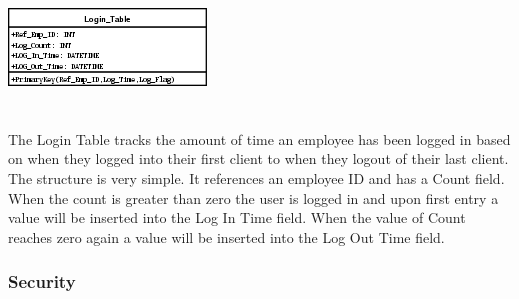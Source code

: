 \documentclass{report}
\begin{document}
	\includegraphics{Tables/LoginTable.png}\\
	\\
	\\
	The Login Table tracks the amount of time an employee has been logged in based on when
	they logged into their first client to when they logout of their last client. The structure
	is very simple. It references an employee ID and has a Count field. When the count is greater
	than zero the user is logged in and upon first entry a value will be inserted into the
	Log In Time field. When the value of Count reaches zero again a value will be inserted into
	the Log Out Time field.
	
	\subsubsection{Security}
\end{document}
